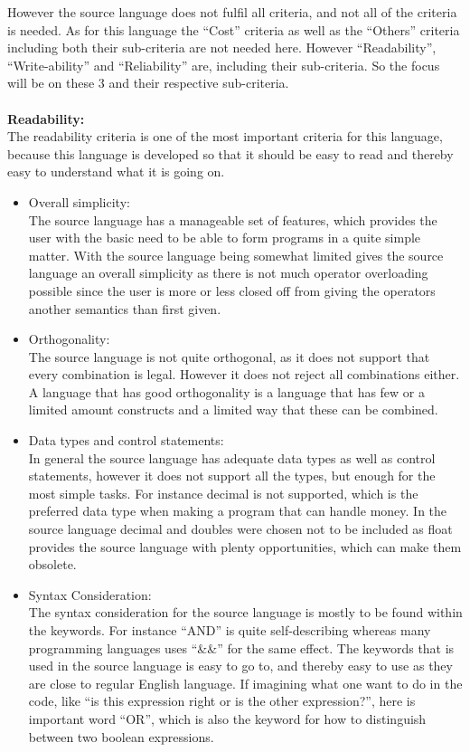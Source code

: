 However the source language does not fulfil all criteria, and not all of the criteria is needed. As for this language the ``Cost'' criteria as well as the ``Others'' criteria including both their sub-criteria are not needed here. However ``Readability'', ``Write-ability'' and ``Reliability'' are, including their sub-criteria. So the focus will be on these 3 and their respective sub-criteria. \\ \\
\textbf{Readability:} \\
The readability criteria is one of the most important criteria for this language, because this language is developed so that it should be easy to read and thereby easy to understand what it is going on. \\
\begin{itemize}
\item Overall simplicity:\\
The source language has a manageable set of features, which provides the user with the basic need to be able to form programs in a quite simple matter. With the source language being somewhat limited gives the source language an overall simplicity as there is not much operator overloading possible since the user is more or less closed off from giving the operators another semantics than first given. 
\item Orthogonality:\\
The source language is not quite orthogonal, as it does not support that every combination is legal. However it does not reject all combinations either. A language that has good orthogonality is a language that has few or a limited amount constructs and a limited way that these can be combined. 
\item Data types and control statements:\\
In general the source language has adequate data types as well as control statements, however it does not support all the types, but enough for the most simple tasks. For instance decimal is not supported, which is the preferred data type when making a program that can handle money. In the source language decimal and doubles were chosen not to be included as float provides the source language with plenty opportunities, which can make them obsolete.
\item Syntax Consideration:\\
The syntax consideration for the source language is mostly to be found within the keywords. For instance ``AND'' is quite self-describing whereas many programming languages uses ``\&\&'' for the same effect. The keywords that is used in the source language is easy to go to, and thereby easy to use as they are close to regular English language. If imagining what one want to do in the code, like ``is this expression right or is the other expression?'', here is important word ``OR'', which is also the keyword for how to distinguish between two boolean expressions.\\ 
\end{itemize}
